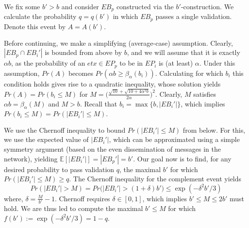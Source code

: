 We fix some $b'>b$ and consider $EB_p$ constructed via the $b'$-construction. We calculate the probability $q=q(b')$ in which $EB_p$ passes a single validation. Denote this event by $A=A(b')$. 

Before continuing, we make a simplifying (average-case) assumption. Clearly, $|EB_p\cap EB_i'|$ is bounded from above by $b$, and we will assume that it is exactly $\alpha b$, as the probability of an $etx \in EP_p$ to be in $EP_i$ is (at least) $\alpha$.
Under this assumption, $Pr(A)$ becomes $Pr\left(\alpha b\ge \beta_{\alpha}(b_i)\right)$. Calculating for which $b_i$ this condition holds gives rise to a quadratic inequality, whose solution yields $Pr(A)=Pr(b_i \leq M)$ for $M=\bigg(\frac{\sqrt{10}+\sqrt{10+4\alpha^2 b}}{2\alpha}\bigg)^2$.
Clearly, $M$ satisfies $\alpha b=\beta_{\alpha}(M)$ and $M>b$. Recall that $b_i=\max\{b,|EB_i'|\}$, which implies $Pr(b_i\leq M)=Pr(|EB_i'|\leq M)$.

We use the Chernoff inequality to bound $Pr(|EB_i'|\leq M)$ from below. For this, we use the expected value of $|EB_i'|$, which can be approximated using a simple symmetry argument (based on the even dissemination of messages in the network), yielding $\mathbb{E}[|EB_i'|]=|EB_p'|=b'$. Our goal now is to find, for any desired probability to pass validation $q$,  the maximal $b'$ for which $Pr(|EB_i'|\leq M)\geq q$. The Chernoff inequality for the complement event yields
$$Pr(|EB_i'| > M)=Pr\big(|EB_i'| > (1+\delta)b'\big)\leq \exp(-\delta^2b' / 3)$$
where, $\delta=\frac{M}{b'}-1$. Chernoff requires $\delta \in [0,1]$, which implies $b'\leq M \leq 2b'$ must hold.
We are thus led to compute the maximal $b'\leq M$ for which $f(b'):=\exp(-\delta^2b' / 3)=1-q$.

